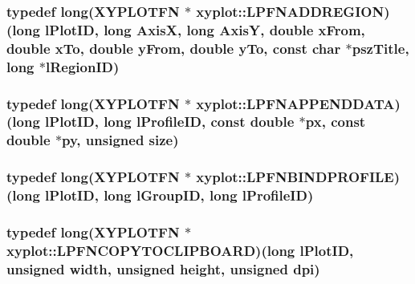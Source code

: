 \hypertarget{namespacexyplot_a0aaffe16c53538a1e712cdc6caef070f}{
\subsubsection[{L\-P\-F\-N\-A\-D\-D\-R\-E\-G\-I\-O\-N}]{\setlength{\rightskip}{0pt plus 5cm}typedef {\bf long}({\bf X\-Y\-P\-L\-O\-T\-F\-N} $\ast$ xyplot\-::\-L\-P\-F\-N\-A\-D\-D\-R\-E\-G\-I\-O\-N)({\bf long} l\-Plot\-I\-D, {\bf long} Axis\-X, {\bf long} Axis\-Y, double x\-From, double x\-To, double y\-From, double y\-To, const char $\ast$psz\-Title, {\bf long} $\ast$l\-Region\-I\-D)}}\label{namespacexyplot_a0aaffe16c53538a1e712cdc6caef070f}
\hypertarget{namespacexyplot_a159121ca25d59ecb75770f0fbeea2515}{
\subsubsection[{L\-P\-F\-N\-A\-P\-P\-E\-N\-D\-D\-A\-T\-A}]{\setlength{\rightskip}{0pt plus 5cm}typedef {\bf long}({\bf X\-Y\-P\-L\-O\-T\-F\-N} $\ast$ xyplot\-::\-L\-P\-F\-N\-A\-P\-P\-E\-N\-D\-D\-A\-T\-A)({\bf long} l\-Plot\-I\-D, {\bf long} {\bf l\-Profile\-I\-D}, const double $\ast${\bf px}, const double $\ast${\bf py}, unsigned {\bf size})}}\label{namespacexyplot_a159121ca25d59ecb75770f0fbeea2515}
\hypertarget{namespacexyplot_ae721ca071f1b5292073d3e831c8b1150}{
\subsubsection[{L\-P\-F\-N\-B\-I\-N\-D\-P\-R\-O\-F\-I\-L\-E}]{\setlength{\rightskip}{0pt plus 5cm}typedef {\bf long}({\bf X\-Y\-P\-L\-O\-T\-F\-N} $\ast$ xyplot\-::\-L\-P\-F\-N\-B\-I\-N\-D\-P\-R\-O\-F\-I\-L\-E)({\bf long} l\-Plot\-I\-D, {\bf long} l\-Group\-I\-D, {\bf long} {\bf l\-Profile\-I\-D})}}\label{namespacexyplot_ae721ca071f1b5292073d3e831c8b1150}
\hypertarget{namespacexyplot_a64a77ea08258ed9ffc0bf7ffda3da7a4}{
\subsubsection[{L\-P\-F\-N\-C\-O\-P\-Y\-T\-O\-C\-L\-I\-P\-B\-O\-A\-R\-D}]{\setlength{\rightskip}{0pt plus 5cm}typedef {\bf long}({\bf X\-Y\-P\-L\-O\-T\-F\-N} $\ast$ xyplot\-::\-L\-P\-F\-N\-C\-O\-P\-Y\-T\-O\-C\-L\-I\-P\-B\-O\-A\-R\-D)({\bf long} l\-Plot\-I\-D, unsigned width, unsigned height, unsigned dpi)}}\label{namespacexyplot_a64a77ea08258ed9ffc0bf7ffda3da7a4}
